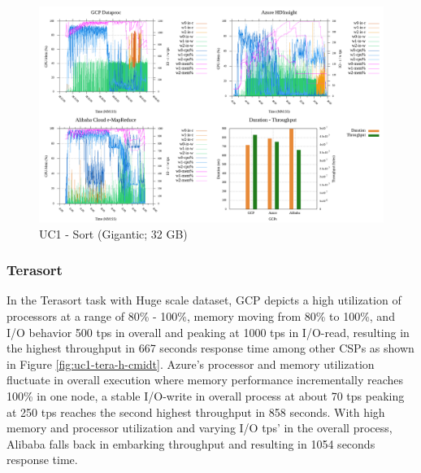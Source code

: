 \documentclass[review]{elsarticle}
\begin{document}
	\begin{figure}[p]
		\caption{UC1 - Sort (Gigantic; 32 GB)}
		\label{fig:uc1-srt-g-cmidt}
		\includegraphics[width=\textwidth]{uc1-srt-g-cmidt}
		\centering
	\end{figure}
	
	\subsubsection{Terasort}
	In the Terasort task with Huge scale dataset, GCP depicts a high utilization of processors at a range of 80\% - 100\%, memory moving from 80\% to 100\%, and I/O behavior 500 tps in overall and peaking at 1000 tps in I/O-read, resulting in the highest throughput in 667 seconds response time among other CSPs as shown in Figure \ref{fig:uc1-tera-h-cmidt}. Azure's processor and memory utilization fluctuate in overall execution where memory performance incrementally reaches 100\% in one node, a stable I/O-write in overall process at about 70 tps peaking at 250 tps reaches the second highest throughput in 858 seconds. With high memory and processor utilization and varying I/O tps' in the overall process, Alibaba falls back in embarking throughput and resulting in 1054 seconds response time.
	
\end{document}
